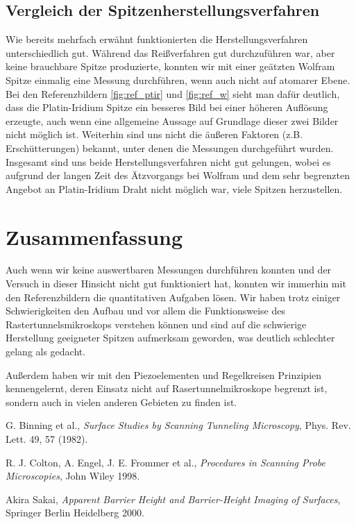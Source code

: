 \documentclass[10pt, a4paper]{article}
\begin{document}
\subsection{Vergleich der Spitzenherstellungsverfahren}

Wie bereits mehrfach erwähnt funktionierten die Herstellungsverfahren unterschiedlich gut.
Während das Reißverfahren gut durchzuführen war, aber keine brauchbare Spitze produzierte, konnten wir mit einer geätzten Wolfram Spitze einmalig eine Messung durchführen, wenn auch nicht auf atomarer Ebene.
Bei den Referenzbildern \ref{fig:ref_ptir} und \ref{fig:ref_w} sieht man dafür deutlich, dass die Platin-Iridium Spitze ein besseres Bild bei einer höheren Auflösung erzeugte, auch wenn eine allgemeine Aussage auf Grundlage dieser zwei Bilder nicht möglich ist.
Weiterhin sind uns nicht die äußeren Faktoren (z.B. Erschütterungen) bekannt, unter denen die Messungen durchgeführt wurden.
Insgesamt sind uns beide Herstellungsverfahren nicht gut gelungen, wobei es aufgrund der langen Zeit des Ätzvorgangs bei Wolfram und dem sehr begrenzten Angebot an Platin-Iridium Draht nicht möglich war, viele Spitzen herzustellen.

\section{Zusammenfassung}

Auch wenn wir keine auswertbaren Messungen durchführen konnten und der Versuch in dieser Hinsicht nicht gut funktioniert hat, konnten wir immerhin mit den Referenzbildern die quantitativen Aufgaben lösen.
Wir haben trotz einiger Schwierigkeiten den Aufbau und vor allem die Funktionsweise des Rastertunnelsmikroskops verstehen können und sind auf die schwierige Herstellung geeigneter Spitzen aufmerksam geworden, was deutlich schlechter gelang als gedacht.

Außerdem haben wir mit den Piezoelementen und Regelkreisen Prinzipien kennengelernt, deren Einsatz nicht auf Rasertunnelmikroskope begrenzt ist, sondern auch in vielen anderen Gebieten zu finden ist.


\begin{thebibliography}{9}

  G. Binning et al.,
  \emph{Surface Studies by Scanning Tunneling Microscopy},
  Phys. Rev. Lett. 49, 57 (1982).

  R. J. Colton, A. Engel, J. E. Frommer et al.,
  \emph{Procedures in Scanning Probe Microscopies},
  John Wiley 1998.

  Akira Sakai,
  \emph{Apparent Barrier Height and Barrier-Height Imaging of Surfaces},
  Springer Berlin Heidelberg 2000.
  
\end{thebibliography}
\end{document}
